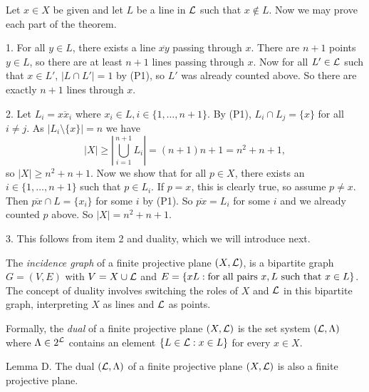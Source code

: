 Let $x\in X$ be given and let $L$ be a line in ${\cal L}$ such that $x\notin L$. Now we may prove each part of the theorem.
\medskip
\item {1.} For all $y\in L$, there exists a line $\overline{xy}$ passing through $x$. There are $n+1$ points $y\in L$, so there are at least $n+1$ lines passing through $x$. Now for all $L'\in{\cal L}$ such that $x\in L'$, $|L\cap L'| = 1$ by (P1), so $L'$ was already counted above. So there are exactly $n+1$ lines through $x$.
\smallskip
\item {2.} Let $L_i = \overline{xx_i}$ where $x_i\in L, i\in\{1,\ldots, n+1\}$. By (P1), $L_i\cap L_j = \{x\}$ for all $i\neq j$. As $|L_i\setminus\{x\}| = n$ we have
    $$|X|\geq |\bigcup_{i=1}^{n+1} L_i| = (n+1)n + 1 = n^2 + n + 1,$$
    so $|X|\geq n^2 + n + 1$.
    Now we show that for all $p\in X$, there exists an $i\in \{1,\ldots,n+1\}$ such that $p\in L_i$. If $p=x$, this is clearly true, so assume $p\neq x$. Then $\overline{px}\cap L = \{x_i\}$ for some $i$ by (P1). So $\overline{px} = L_i$ for some $i$ and we already counted $p$ above. So $|X| = n^2 + n + 1$.
\smallskip
\item {3.} This follows from item 2 and duality, which we will introduce next.\slug

The {\it incidence graph} of a finite projective plane $(X,{\cal L})$, is a bipartite graph $G = (V, E)$ with $V = X\cup {\cal L}$ and $E = \{xL : \hbox{for all pairs}\ x,L\ \hbox{such that}\ x\in L\}$. The concept of duality involves switching the roles of $X$ and ${\cal L}$ in this bipartite graph, interpreting $X$ as lines and ${\cal L}$ as points.

Formally, the {\it dual} of a finite projective plane $(X,{\cal L})$ is the set system $({\cal L}, \Lambda)$ where $\Lambda\in 2^{\cal L}$ contains an element $\{L\in {\cal L} : x\in L\}$ for every $x\in X$.

\proclaim Lemma D. The dual $({\cal L}, \Lambda)$ of a finite projective plane $(X,{\cal L})$ is also a finite projective plane.

